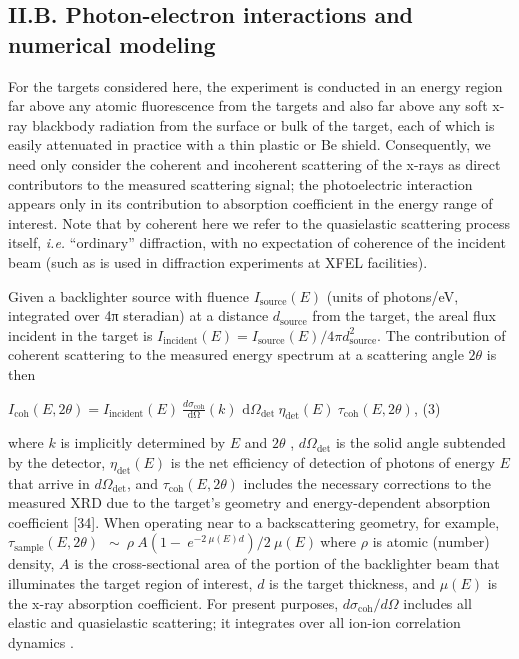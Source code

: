 \FloatBarrier

\subsection{II.B. Photon-electron interactions and numerical modeling }

For the targets considered here, the experiment is conducted in an
energy region far above any atomic fluorescence from the targets and
also far above any soft x-ray blackbody radiation from the surface or
bulk of the target, each of which is easily attenuated in practice with
a thin plastic or Be shield. Consequently, we need only consider the
coherent and incoherent scattering of the x-rays as direct contributors
to the measured scattering signal; the photoelectric interaction appears
only in its contribution to absorption coefficient in the energy range
of interest. Note that by coherent here we refer to the quasielastic
scattering process itself, \emph{i.e.} ``ordinary'' diffraction, with no
expectation of coherence of the incident beam (such as is used in
diffraction experiments at XFEL facilities).

Given a backlighter source with fluence
\(I_{\text{source}}\left( E \right)\) (units of photons/eV, integrated
over 4π steradian) at a distance \(d_{\text{source}}\) from the target,
the areal flux incident in the target is
\(I_{\text{incident}}\left( E \right) = I_{\text{source}}\left( E \right)/4\pi d_{\text{source}}^{2}\).
The contribution of coherent scattering to the measured energy spectrum
at a scattering angle \(2\theta\) is then

\(I_{\text{coh}}\left( E,2\theta \right) = I_{\text{incident}}\left( E \right)\ \frac{d\sigma_{\text{coh}}}{\text{dΩ}}\left( k \right)\text{\ d}\Omega_{\det}\ \eta_{\det}\left( E \right)\ \tau_{\text{coh}}\left( E,2\theta \right)\),
(3)

where \(k\) is implicitly determined by \(E\) and \(2\theta\) ,
\(d\Omega_{\det}\) is the solid angle subtended by the detector,
\(\eta_{\det}\left( E \right)\) is the net efficiency of detection of
photons of energy \(E\) that arrive in \(d\Omega_{\det}\), and
\(\tau_{\text{coh}}\left( E,2\theta \right)\) includes the necessary
corrections to the measured XRD due to the target's geometry and
energy-dependent absorption coefficient
{[}34{]}.
When operating near to a backscattering geometry, for example,
\(\tau_{\text{sample}}\left( E,2\theta \right)\ \ \sim\ \rho\ A(1 - \ e^{- 2\ \mu\left( E \right)d})/2\ \mu(E)\ \)where
\(\rho\) is atomic (number) density, \(A\) is the cross-sectional area
of the portion of the backlighter beam that illuminates the target
region of interest, \(d\) is the target thickness, and
\(\mu\left( E \right)\) is the x-ray absorption coefficient. For present
purposes, \(d\sigma_{\text{coh}}/d\Omega\) includes all elastic and
quasielastic scattering; it integrates over all ion-ion correlation
dynamics
 \cite{gregori2009low}.

